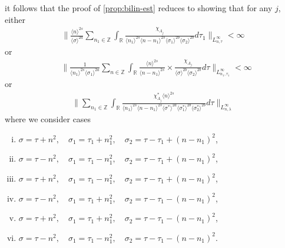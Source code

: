 \documentclass[12pt,reqno]{amsart}
\numberwithin{equation}{section}  %
\numberwithin{figure}{section}
\newcommand{\rr}{\mathbb{R}}
\newcommand{\zz}{\mathbb{Z}}
\theoremstyle{plain}
\theoremstyle{definition}
\theoremstyle{remark}
\begin{document}
%
%
it follows that the proof of \autoref{prop:bilin-est} reduces to showing that
for any $j$, either 
%
%
\begin{equation}
  \label{sup-est-gen-per-1}
  \begin{split}
    \| \frac{ \langle n
    \rangle ^{2s}}{\langle \sigma \rangle ^{2a}}
    \sum_{n_{1} \in \zz} \int_{\rr} \frac{\chi_{A_{j}}}{ \langle n_{1} \rangle ^{2s} \langle n-n_{1} \rangle ^{2s} 
    \langle \sigma_{1} \rangle^{2b} \langle  \sigma_{2} \rangle^{2b} }
    d \tau_1  \|_{L^{\infty}_{n, \tau}} < \infty
  \end{split}
\end{equation}
%
%
or 
\begin{equation}
  \label{sup-est-gen-per-2}
\begin{split}
  & \| \frac{1}{\langle n_{1} \rangle ^{2s}
  \langle \sigma_{1} \rangle
  ^{2a}} \sum_{n \in \zz} \int_{\rr} \frac{\langle n \rangle ^{2s}}{\langle
  n - n_{1}\rangle ^{2s}}  \times \frac{\chi_{A_{j}}}{\langle
  \sigma \rangle ^{2b} \langle \sigma_{2} \rangle ^{2b}} d \tau 
  \|_{L^{\infty}_{n_{1}, \tau_{1}}} < \infty
\end{split}
\end{equation}
%
or
\begin{equation}
  \label{sup-est-gen-per-3}
\begin{split}
  \| \sum_{n_{1} \in \zz} \int_{\rr} \frac{\chi^{*}_{A_{j}}
    \langle n \rangle ^{2s}
    }{ \langle n_{1} \rangle^{2s} \langle
    n-n_{1} \rangle ^{2s} \langle \sigma^{*}  
    \rangle ^{2a}
    \langle \sigma_{1}^{*} \rangle^{2b}
    \langle  \sigma_{2}^{*} \rangle^{2b}  } d \tau  \|_{L^{\infty}_{n, \lambda}}
\end{split}
\end{equation}
%
%
where we consider cases
\begin{enumerate}[(i)]
    \item $ \sigma=\tau+n^2,\quad \sigma_1=\tau_1+n_1^2,\quad \sigma_2=\tau -
      \tau_1+(n - n_1)^2$,
\label{it-1}
    \item $ \sigma=\tau-n^2,\quad \sigma_1=\tau_1-n_1^2,\quad \sigma_2=\tau - \tau_1+(n - n_1)^2$,
\label{it-2}
    \item  $\sigma=\tau+n^2,\quad \sigma_1=\tau_1-n_1^2,\quad \sigma_2=\tau - \tau_1+(n - n_1)^2$,
      \label{it-3}
    \item $\sigma=\tau-n^2,\quad \sigma_1=\tau_1+n_1^2,\quad \sigma_2=\tau - \tau_1-(n - n_1)^2$,
\label{it-4}
    \item $\sigma=\tau+n^2,\quad \sigma_1=\tau_1+n_1^2,\quad \sigma_2=\tau - \tau_1-(n - n_1)^2$,
\label{it-5}
    \item $\sigma=\tau-n^2,\quad \sigma_1=\tau_1-n_1^2,\quad \sigma_2=\tau - \tau_1-(n - n_1)^2$.
\label{it-6}
\end{enumerate}
\end{document}

